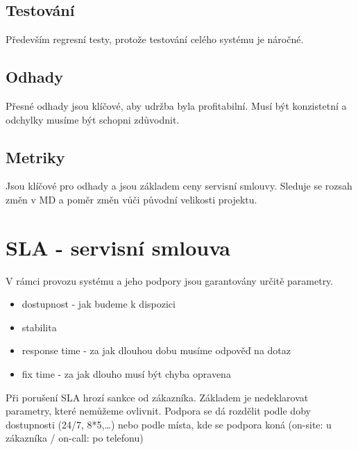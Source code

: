 \documentclass{szzclass}
\begin{document}
\subsection{Testování}
Především regresní testy, protože testování celého systému je náročné.
\subsection{Odhady}
Přesné odhady jsou klíčové, aby udržba byla profitabilní. Musí být konzistetní a odchylky musíme být schopni zdůvodnit.
\subsection{Metriky}
Jsou klíčové pro odhady a jsou základem ceny servisní smlouvy. Sleduje se rozsah změn v MD a poměr změn vůči původní velikosti projektu.
\section{SLA - servisní smlouva}
V rámci provozu systému a jeho podpory jsou garantovány určitě parametry.
\begin{itemize}
    \item dostupnost - jak budeme k dispozici
    \item stabilita
    \item response time - za jak dlouhou dobu musíme odpověď na dotaz
    \item fix time - za jak dlouho musí být chyba opravena
\end{itemize}
Při porušení SLA hrozí sankce od zákazníka. Základem je nedeklarovat parametry, které nemůžeme ovlivnit.
\newline
Podpora se dá rozdělit podle doby dostupnosti (24/7, 8*5,\dots) nebo podle místa, kde se podpora koná (on-site: u zákazníka / on-call: po telefonu)
\end{document}
